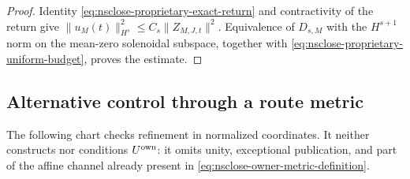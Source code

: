 \begin{proof}
Identity \eqref{eq:nsclose-proprietary-exact-return} and contractivity of the return give \(\|u_M(t)\|_{H^s}^2\le C_s\|Z_{M,J,t}\|^2\). Equivalence of \(D_{s,M}\) with the \(H^{s+1}\) norm on the mean-zero solenoidal subspace, together with \eqref{eq:nsclose-proprietary-uniform-budget}, proves the estimate.
\end{proof}

\subsection{Alternative control through a route metric}

The following chart checks refinement in normalized coordinates. It neither constructs nor conditions \(U^{\rm own}\): it omits unity, exceptional publication, and part of the affine channel already present in \eqref{eq:nsclose-owner-metric-definition}.

